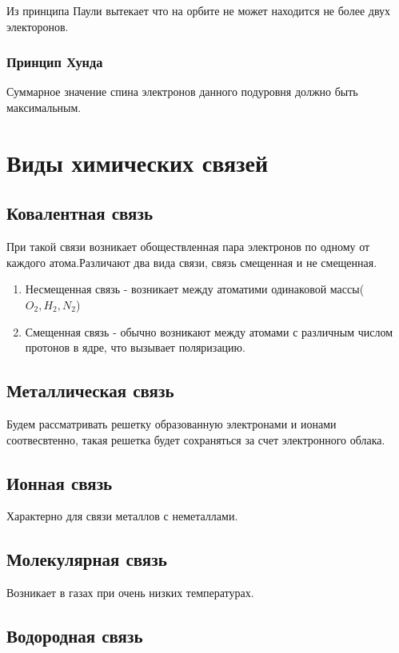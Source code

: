 \documentclass[../main.tex]{subfiles}
\begin{document}
Из принципа Паули вытекает что на орбите не может находится не более двух электоронов.

\subsubsection{Принцип Хунда}
\begin{center}
    Суммарное значение спина электронов данного подуровня должно быть максимальным.
\end{center}

\section{Виды химических связей}

\subsection{Ковалентная связь}

При такой связи возникает обоществленная пара электронов  по одному от каждого атома.Различают два вида связи, связь смещенная и не смещенная.
\begin{enumerate}
    \item Несмещенная связь - возникает между атоматими одинаковой массы($O_2, H_2, N_2$)
    \item Смещенная связь - обычно возникают между атомами с различным числом протонов в ядре, что вызывает поляризацию.
\end{enumerate}

\subsection{Металлическая связь}
Будем рассматривать решетку образованную электронами и ионами соотвесвтенно, такая решетка будет сохраняться за счет электронного облака.

\subsection{Ионная связь}
Характерно для связи металлов с неметаллами.
\subsection{Молекулярная связь}
Возникает в газах при очень низких температурах.

\subsection{Водородная связь}
\end{document}
